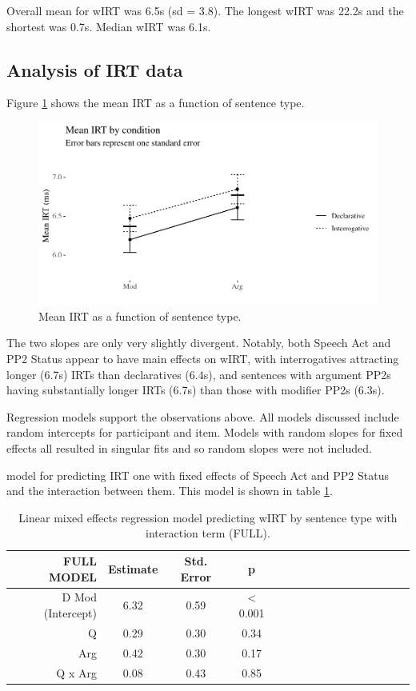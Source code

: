 \documentclass[12pt,oneside]{book}
\begin{document}
Overall mean for wIRT was 6.5s (sd = 3.8). The longest wIRT was 22.2s and the shortest was 0.7s. Median wIRT was 6.1s.

\hypertarget{irtRes}{%
\subsection{Analysis of IRT data}\label{irtRes}}

Figure \ref{fig:interactionplot} shows the mean IRT as a function of sentence type.

\begin{figure}
\centering
\includegraphics{4-results_files/figure-latex/interactionplot-1.pdf}
\caption{\label{fig:interactionplot}Mean IRT as a function of sentence type.}
\end{figure}

The two slopes are only very slightly divergent. Notably, both Speech Act and PP2 Status appear to have main effects on wIRT, with interrogatives attracting longer (6.7s) IRTs than declaratives (6.4s), and sentences with argument PP2s having substantially longer IRTs (6.7s) than those with modifier PP2s (6.3s).

Regression models support the observations above. All models discussed include random intercepts for participant and item. Models with random slopes for fixed effects all resulted in singular fits and so random slopes were not included.

 model for predicting IRT  one with fixed effects of Speech Act and PP2 Status and the interaction between them. This model is shown in table \ref{tab:hyp}.

\begin{table}[!h]

\caption{\label{tab:hyp}Linear mixed effects regression model predicting wIRT by sentence type with interaction term (FULL).}
\centering
\begin{tabular}{rcccrcccrcccrccc}
\toprule
FULL MODEL & Estimate & Std. Error & p\\
\midrule
D Mod (Intercept) & 6.32 & 0.59 & < 0.001\\
Q & 0.29 & 0.30 & 0.34\\
Arg & 0.42 & 0.30 & 0.17\\
Q x Arg & 0.08 & 0.43 & 0.85\\
\bottomrule
\end{tabular}
\end{table}
\end{document}
